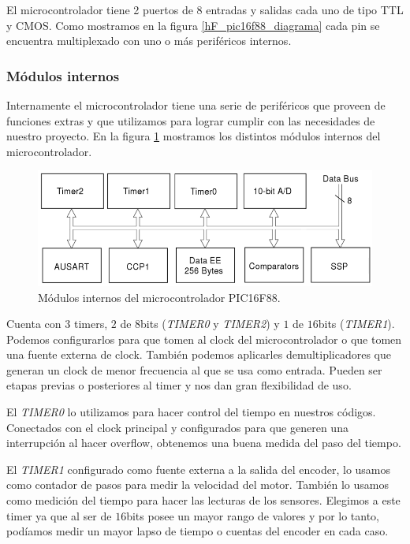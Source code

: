 El microcontrolador tiene 2 puertos de 8 entradas y salidas cada uno de tipo TTL y CMOS.
Como mostramos en la figura \ref{hF_pic16f88_diagrama} cada pin se encuentra multiplexado con uno o m\'as perif\'ericos internos.

\subsubsection{M\'odulos internos}
\label{h_controlador_micro_modulos}

Internamente el microcontrolador tiene una serie de perif\'ericos que proveen de funciones extras y que utilizamos para lograr
cumplir con las necesidades de nuestro proyecto.
En la figura \ref{hF_pic16f88_modulos} mostramos los distintos m\'odulos internos del microcontrolador.

\begin{figure}[b]
	\centering
	\includegraphics[scale=0.35]{figuras/pic16f88_modulos.png}
	\caption{M\'odulos internos del microcontrolador PIC16F88.}
	\label{hF_pic16f88_modulos}
\end{figure}

Cuenta con $3$ timers, $2$ de $8$bits (\emph{TIMER0} y \emph{TIMER2}) y $1$ de $16$bits (\emph{TIMER1}).
Podemos configurarlos para que tomen al clock del microcontrolador o que tomen una fuente externa de clock.
Tambi\'en podemos aplicarles demultiplicadores que generan un clock de menor frecuencia al que se usa como entrada.
Pueden ser etapas previas o posteriores al timer y nos dan gran flexibilidad de uso.

El \emph{TIMER0} lo utilizamos para hacer control del tiempo en nuestros c\'odigos.
Conectados con el clock principal y configurados para que generen una interrupci\'on al hacer overflow,
obtenemos una buena medida del paso del tiempo.

El \emph{TIMER1} configurado como fuente externa a la salida del encoder, lo usamos como contador de pasos para medir la
velocidad del motor.
Tambi\'en lo usamos como medici\'on del tiempo para hacer las lecturas de los sensores.
Elegimos a este timer ya que al ser de $16$bits posee un mayor rango de valores y por lo tanto, pod\'iamos medir un mayor lapso
de tiempo o cuentas del encoder en cada caso.

